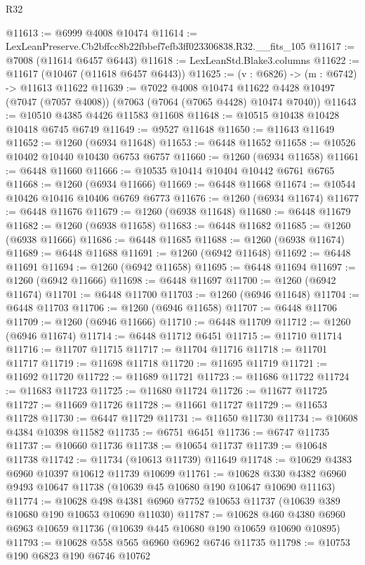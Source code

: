 \begin{lexlean}{R32}
\begin{coremodule}
@11613 := @6999 @4008 @10474
@11614 := LexLeanPreserve.Cb2bffcc8b22fbbef7efb3ff023306838.R32.__fits_105
@11617 := @7008 (@11614 @6457 @6443)
@11618 := LexLeanStd.Blake3.columns
@11622 := @11617 (@10467 (@11618 @6457 @6443))
@11625 := (v : @6826) -> (m : @6742) -> @11613 @11622
@11639 := @7022
    @4008
    @10474
    @11622
    @4428
    @10497
    (@7047 (@7057 @4008))
    (@7063 (@7064 (@7065 @4428) @10474 @7040))
@11643 := @10510 @4385 @4426 @11583 @11608
@11648 := @10515 @10438 @10428 @10418 @6745 @6749
@11649 := @9527 @11648
@11650 := @11643 @11649
@11652 := @1260 (@6934 @11648)
@11653 := @6448 @11652
@11658 := @10526 @10402 @10440 @10430 @6753 @6757
@11660 := @1260 (@6934 @11658)
@11661 := @6448 @11660
@11666 := @10535 @10414 @10404 @10442 @6761 @6765
@11668 := @1260 (@6934 @11666)
@11669 := @6448 @11668
@11674 := @10544 @10426 @10416 @10406 @6769 @6773
@11676 := @1260 (@6934 @11674)
@11677 := @6448 @11676
@11679 := @1260 (@6938 @11648)
@11680 := @6448 @11679
@11682 := @1260 (@6938 @11658)
@11683 := @6448 @11682
@11685 := @1260 (@6938 @11666)
@11686 := @6448 @11685
@11688 := @1260 (@6938 @11674)
@11689 := @6448 @11688
@11691 := @1260 (@6942 @11648)
@11692 := @6448 @11691
@11694 := @1260 (@6942 @11658)
@11695 := @6448 @11694
@11697 := @1260 (@6942 @11666)
@11698 := @6448 @11697
@11700 := @1260 (@6942 @11674)
@11701 := @6448 @11700
@11703 := @1260 (@6946 @11648)
@11704 := @6448 @11703
@11706 := @1260 (@6946 @11658)
@11707 := @6448 @11706
@11709 := @1260 (@6946 @11666)
@11710 := @6448 @11709
@11712 := @1260 (@6946 @11674)
@11714 := @6448 @11712 @6451
@11715 := @11710 @11714
@11716 := @11707 @11715
@11717 := @11704 @11716
@11718 := @11701 @11717
@11719 := @11698 @11718
@11720 := @11695 @11719
@11721 := @11692 @11720
@11722 := @11689 @11721
@11723 := @11686 @11722
@11724 := @11683 @11723
@11725 := @11680 @11724
@11726 := @11677 @11725
@11727 := @11669 @11726
@11728 := @11661 @11727
@11729 := @11653 @11728
@11730 := @6447 @11729
@11731 := @11650 @11730
@11734 := @10608 @4384 @10398 @11582
@11735 := @6751 @6451
@11736 := @6747 @11735
@11737 := @10660 @11736
@11738 := @10654 @11737
@11739 := @10648 @11738
@11742 := @11734 (@10613 @11739) @11649
@11748 := @10629 @4383 @6960 @10397 @10612 @11739 @10699
@11761 := @10628 @330 @4382 @6960 @9493 @10647 @11738 (@10639 @45 @10680 @190 @10647 @10690 @11163)
@11774 := @10628 @498 @4381 @6960 @7752 @10653 @11737 (@10639 @389 @10680 @190 @10653 @10690 @11030)
@11787 := @10628 @460 @4380 @6960 @6963 @10659 @11736 (@10639 @445 @10680 @190 @10659 @10690 @10895)
@11793 := @10628 @558 @565 @6960 @6962 @6746 @11735
@11798 := @10753 @190 @6823 @190 @6746 @10762

\end{coremodule}
\end{lexlean}
